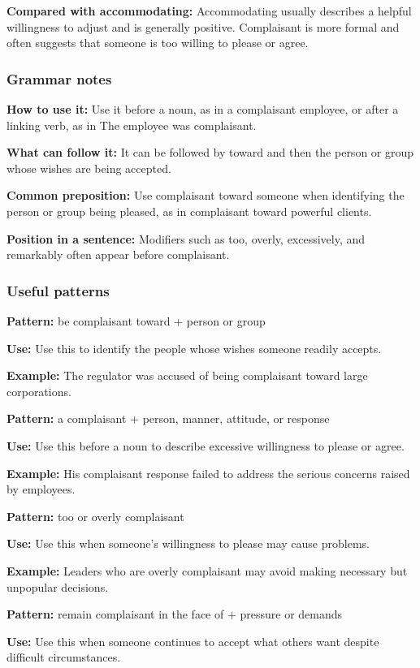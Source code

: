 \documentclass[11pt]{article}
\begin{document}
\textbf{Compared with accommodating:} Accommodating usually describes a helpful willingness to adjust and is generally positive. Complaisant is more formal and often suggests that someone is too willing to please or agree.

\subsubsection{Grammar notes}
\textbf{How to use it:} Use it before a noun, as in a complaisant employee, or after a linking verb, as in The employee was complaisant.

\textbf{What can follow it:} It can be followed by toward and then the person or group whose wishes are being accepted.

\textbf{Common preposition:} Use complaisant toward someone when identifying the person or group being pleased, as in complaisant toward powerful clients.

\textbf{Position in a sentence:} Modifiers such as too, overly, excessively, and remarkably often appear before complaisant.

\subsubsection{Useful patterns}
\textbf{Pattern:} be complaisant toward + person or group

\textbf{Use:} Use this to identify the people whose wishes someone readily accepts.

\textbf{Example:} The regulator was accused of being complaisant toward large corporations.

\textbf{Pattern:} a complaisant + person, manner, attitude, or response

\textbf{Use:} Use this before a noun to describe excessive willingness to please or agree.

\textbf{Example:} His complaisant response failed to address the serious concerns raised by employees.

\textbf{Pattern:} too or overly complaisant

\textbf{Use:} Use this when someone's willingness to please may cause problems.

\textbf{Example:} Leaders who are overly complaisant may avoid making necessary but unpopular decisions.

\textbf{Pattern:} remain complaisant in the face of + pressure or demands

\textbf{Use:} Use this when someone continues to accept what others want despite difficult circumstances.
\end{document}
